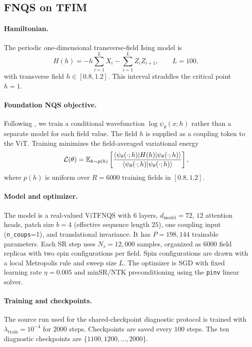\subsection{FNQS on TFIM}

\paragraph{Hamiltonian.}
The periodic one-dimensional transverse-field Ising model is
\[
    H(h)=-h\sum_{i=1}^{L}X_i-\sum_{i=1}^{L}Z_iZ_{i+1},
    \qquad L=100,
\]
with transverse field $h\in[0.8,1.2]$. This interval straddles the critical
point $h=1$.

\paragraph{Foundation NQS objective.}
Following \citet{rende2025foundation}, we train a conditional wavefunction
$\log\psi_\theta(x;h)$ rather than a separate model for each field value. The
field $h$ is supplied as a coupling token to the ViT. Training minimizes the
field-averaged variational energy
\begin{equation}\label{eq:fnqs_loss}
    \mathcal{L}(\theta)
    =
    \mathbb{E}_{h\sim p(h)}
    \left[
        \frac{
            \langle\psi_\theta(\cdot;h)|H(h)|\psi_\theta(\cdot;h)\rangle
        }{
            \langle\psi_\theta(\cdot;h)|\psi_\theta(\cdot;h)\rangle
        }
    \right],
\end{equation}
where $p(h)$ is uniform over $R=6000$ training fields in $[0.8,1.2]$.

\paragraph{Model and optimizer.}
The model is a real-valued ViTFNQS with $6$ layers, $d_{\mathrm{model}}=72$,
$12$ attention heads, patch size $b=4$ (effective sequence length $25$), one
coupling input (\texttt{n\_coups}=1), and translational invariance. It has
$P=198{,}144$ trainable parameters. Each SR step uses $N_s=12{,}000$ samples,
organized as $6000$ field replicas with two spin configurations per field. Spin
configurations are drawn with a local Metropolis rule and sweep size $L$. The
optimizer is SGD with fixed learning rate $\eta=0.005$ and minSR/NTK
preconditioning using the \texttt{pinv} linear solver.

\paragraph{Training and checkpoints.}
The source run used for the shared-checkpoint diagnostic protocol is trained
with $\lambda_{\mathrm{train}}=10^{-4}$ for $2000$ steps. Checkpoints are saved
every $100$ steps. The ten diagnostic checkpoints are
$\{1100,1200,\ldots,2000\}$.

